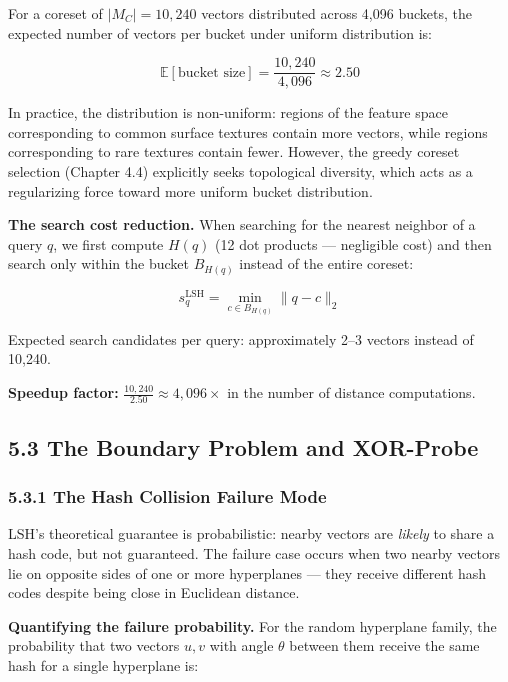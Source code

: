 \documentclass[12pt, a4paper, oneside]{report}
\begin{document}
For a coreset of \(|M_C| = 10{,}240\) vectors distributed across 4,096 buckets, the expected number of vectors per bucket under uniform distribution is:

\[\mathbb{E}[\text{bucket size}] = \frac{10{,}240}{4{,}096} \approx 2.50\]

In practice, the distribution is non-uniform: regions of the feature space corresponding to common surface textures contain more vectors, while regions corresponding to rare textures contain fewer. However, the greedy coreset selection (Chapter 4.4) explicitly seeks topological diversity, which acts as a regularizing force toward more uniform bucket distribution.

\textbf{The search cost reduction.} When searching for the nearest neighbor of a query \(q\), we first compute \(H(q)\) (12 dot products --- negligible cost) and then search only within the bucket \(B_{H(q)}\) instead of the entire coreset:

\[s_q^{\text{LSH}} = \min_{c \in B_{H(q)}} \|q - c\|_2\]

Expected search candidates per query: approximately 2--3 vectors instead of 10,240.

\textbf{Speedup factor:} \(\frac{10{,}240}{2.50} \approx 4{,}096\times\) in the number of distance computations.

\bigskip\noindent\hrulefill\bigskip

\subsection{5.3 The Boundary Problem and XOR-Probe}\label{the-boundary-problem-and-xor-probe}

\subsubsection{5.3.1 The Hash Collision Failure Mode}\label{the-hash-collision-failure-mode}

LSH's theoretical guarantee is probabilistic: nearby vectors are \emph{likely} to share a hash code, but not guaranteed. The failure case occurs when two nearby vectors lie on opposite sides of one or more hyperplanes --- they receive different hash codes despite being close in Euclidean distance.

\textbf{Quantifying the failure probability.} For the random hyperplane family, the probability that two vectors \(u, v\) with angle \(\theta\) between them receive the same hash for a single hyperplane is:
\end{document}
